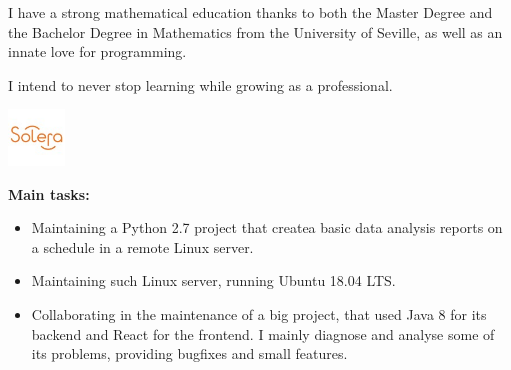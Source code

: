 \documentclass[10pt,a4paper]{altacv}
\begin{document}
\tagline{}

\begin{fullwidth}
\makecvheader
\end{fullwidth}

I have a strong mathematical education thanks to both the Master Degree and the Bachelor Degree in Mathematics from the University of Seville, as well as an innate love for programming.

I intend to never stop learning while growing as a professional. 
 
\begin{minipage}[t]{0.3\linewidth}
	\centering
  \includegraphics[width=15mm]{soleraInc.jpg}
\end{minipage}
\begin{minipage}[b]{0.69\linewidth}
\end{minipage}

\begin{addmargin}{2em}
\begin{small}
\textbf{Main tasks:}
\begin{itemize}
  \item Maintaining a Python 2.7 project that createa basic data analysis reports on a schedule in a remote Linux server.
  \item Maintaining such Linux server, running Ubuntu 18.04 LTS.
  \item Collaborating in the maintenance of a big project, that used Java 8 for its backend and React for the frontend. I mainly diagnose and analyse some of its problems, providing bugfixes and small features.
\end{itemize}
\end{small}
\end{addmargin}
\end{document}
